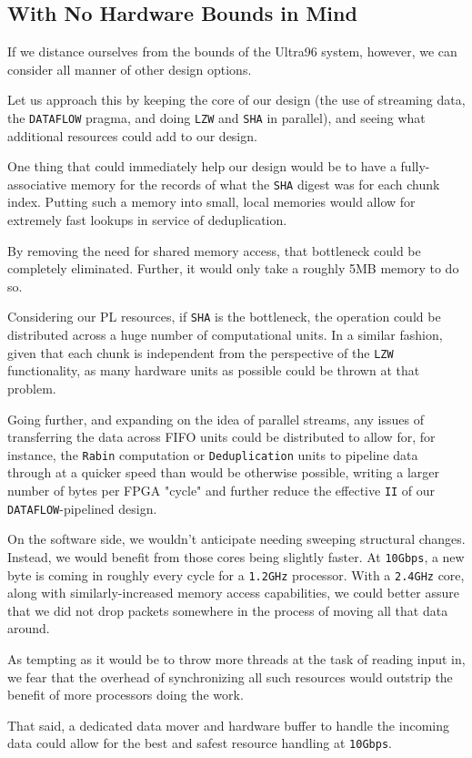 \documentclass{article}
\begin{document}
\subsection{With No Hardware Bounds in Mind}

If we distance ourselves from the bounds of the Ultra96 system, however, we can consider all manner of other design options.
\par
Let us approach this by keeping the core of our design (the use of streaming data, the \texttt{DATAFLOW} pragma, and doing \texttt{LZW} and \texttt{SHA} in parallel), and seeing what additional resources could add to our design.
\newline\par
One thing that could immediately help our design would be to have a fully-associative memory for the records of what the \texttt{SHA} digest was for each chunk index. Putting such a memory into small, local memories would allow for extremely fast lookups in service of deduplication.
\par
By removing the need for shared memory access, that bottleneck could be completely eliminated. Further, it would only take a roughly 5MB memory to do so.
\newline\par
Considering our PL resources, if \texttt{SHA} is the bottleneck, the operation could be distributed across a huge number of computational units. In a similar fashion, given that each chunk is independent from the perspective of the \texttt{LZW} functionality, as many hardware units as possible could be thrown at that problem.
\par
Going further, and expanding on the idea of parallel streams, any issues of transferring the data across FIFO units could be distributed to allow for, 
for instance, the \texttt{Rabin} computation or \texttt{Deduplication} units to pipeline data through at a quicker speed than would be otherwise possible, 
writing a larger number of bytes per FPGA "cycle" and further reduce the effective \texttt{II} of our \texttt{DATAFLOW}-pipelined design.
\newline\par
On the software side, we wouldn't anticipate needing sweeping structural changes. Instead, we would benefit from those cores being slightly faster. At \texttt{10Gbps}, a new byte is coming in roughly every cycle for a \texttt{1.2GHz} processor. 
With a \texttt{2.4GHz} core, along with similarly-increased memory access capabilities, we could better assure that we did not drop packets somewhere in the process of moving all that data around.
\par 
As tempting as it would be to throw more threads at the task of reading input in, we fear that the overhead of synchronizing all such resources would outstrip the benefit of more processors doing the work.
\par
That said, a dedicated data mover and hardware buffer to handle the incoming data could allow for the best and safest resource handling at \texttt{10Gbps}.
\end{document}
